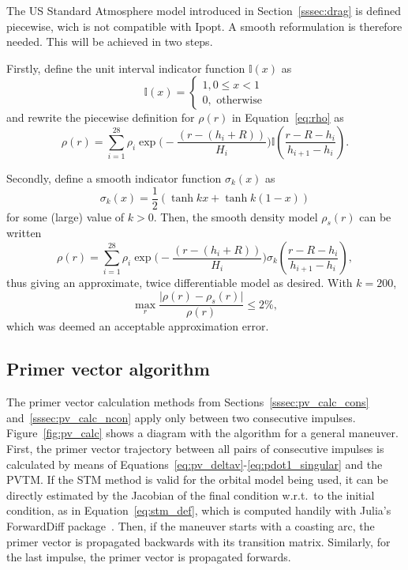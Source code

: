 The US Standard Atmosphere model introduced in Section~\ref{sssec:drag} is defined piecewise, wich is not compatible with Ipopt. A smooth reformulation is therefore needed. This will be achieved in two steps.

Firstly, define the unit interval indicator function \(\mathbb{I} (x)\) as
\begin{equation}
    \mathbb{I} (x) = \begin{cases}
        1, 0 \leq x < 1 \\
        0, \text{ otherwise}
    \end{cases}
\end{equation}
and rewrite the piecewise definition for \(\rho(r)\) in Equation~\eqref{eq:rho} as
\begin{equation}
    \rho(r) = \sum_{i = 1}^{28} \rho_i \exp{\big(-\frac{\left(r - (h_i + R)\right)}{H_i}\big)} \mathbb{I}(\frac{r - R - h_i}{h_{i+1} - h_i}).
\end{equation}

Secondly, define a smooth indicator function \(\sigma_k(x)\) as
\begin{equation}
    \sigma_k(x) = \frac{1}{2} \left(\tanh{k x} + \tanh{k (1 - x)}\right)
\end{equation}
for some (large) value of \(k > 0\). Then, the smooth density model \(\rho_s(r)\) can be written
\begin{equation}
    \rho(r) = \sum_{i = 1}^{28} \rho_i \exp{\big(-\frac{\left(r - (h_i + R)\right)}{H_i}\big)} \sigma_k(\frac{r - R - h_i}{h_{i+1} - h_i}),
\end{equation}
thus giving an approximate, twice differentiable model as desired. With \(k = 200\), 
\begin{equation}
    \max_r \frac{\lvert \rho(r) - \rho_s(r) \rvert}{\rho(r)} \leq 2\%,
\end{equation}
which was deemed an acceptable approximation error.

\subsection{Primer vector algorithm}

The primer vector calculation methods from Sections~\ref{sssec:pv_calc_cons} and~\ref{sssec:pv_calc_ncon} apply only between two consecutive impulses. Figure~\ref{fig:pv_calc} shows a diagram with the algorithm for a general maneuver. First, the primer vector trajectory between all pairs of consecutive impulses is calculated by means of Equations~\eqref{eq:pv_deltav}-\eqref{eq:pdot1_singular} and the PVTM\@. If the STM method is valid for the orbital model being used, it can be directly estimated by the Jacobian of the final condition w.r.t.\ to the initial condition, as in Equation~\eqref{eq:stm_def}, which is computed handily with Julia's ForwardDiff package~\cite{forward_diff}. Then, if the maneuver starts with a coasting arc, the primer vector is propagated backwards with its transition matrix. Similarly, for the last impulse, the primer vector is propagated forwards. 

